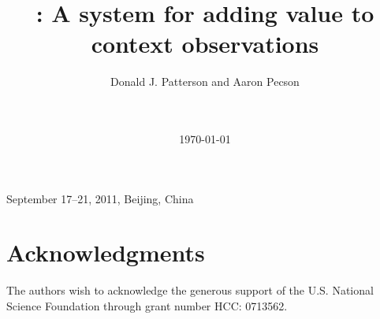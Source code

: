 \documentclass{chi2008}
\title{\Cacophony: A system for adding value to context observations}
\author{
\alignauthor
Donald J. Patterson and Aaron Pecson\\
       \affaddr{Department of Informatics}\\
       \affaddr{University of California, Irvine, USA}\\
       \email{ \{djp3,apecson\}@uci.edu}
}
\begin{document}
 {September 17--21, 2011, Beijing, China} 





\date{\today}

\maketitle







\section{Acknowledgments}
The authors wish to acknowledge the generous support of the U.S. National
Science Foundation through grant number HCC: 0713562.



\balancecolumns
\end{document}

